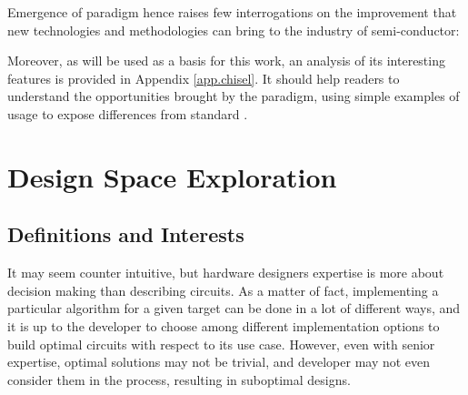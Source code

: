         Emergence of  paradigm hence raises few interrogations on the improvement that new technologies and methodologies can bring to the industry of semi-conductor:

        Moreover, as \chisel{} will be used as a basis for this work, an analysis of its interesting features is provided in Appendix \ref{app.chisel}. It should help readers to understand the opportunities brought by the  paradigm, using simple examples of \chisel{} usage to expose differences from standard .



\clearpage
\section{Design Space Exploration}
\label{ch.problem:sec.dse}

    \subsection{Definitions and Interests}
    \label{ch.problem:sec.dse:ssec.definitions}

    It may seem counter intuitive, but hardware designers expertise is more about decision making than describing circuits.
    As a matter of fact, implementing a particular algorithm for a given target can be done in a lot of different ways, and it is up to the developer to choose among different implementation options to build optimal circuits with respect to its use case.
    However, even with senior expertise, optimal solutions may not be trivial, and developer may not even consider them in the process, resulting in suboptimal designs.
    
